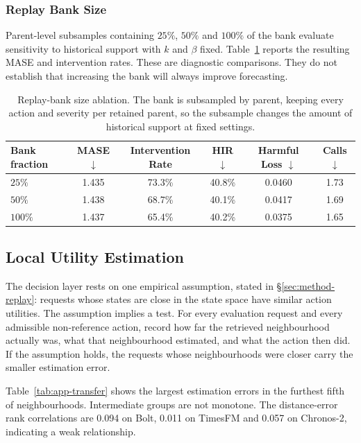 \documentclass{article}
\begin{document}
\subsubsection{Replay Bank Size}
\label{app:replaysize}
Parent-level subsamples containing $25\%$, $50\%$ and $100\%$ of the bank evaluate
sensitivity to historical support with $k$ and $\beta$ fixed. Table~\ref{tab:app-replaysize}
reports the resulting MASE and intervention rates. These are diagnostic comparisons.
They do not establish that increasing the bank will always improve forecasting.

\begin{table}[htbp]
  \caption{Replay-bank size ablation. The bank is subsampled by parent, keeping
  every action and severity per retained parent, so the subsample changes the amount of
  historical support at fixed settings.}
  \label{tab:app-replaysize}
  \centering
  \small
  \setlength{\tabcolsep}{4pt}
  \begin{tabular}{lccccc}
    \toprule
    Bank fraction & MASE $\downarrow$ & Intervention Rate & HIR $\downarrow$ & Harmful Loss $\downarrow$ & Calls $\downarrow$ \\
    \midrule
    $25\%$  & 1.435  & 73.3\%  & 40.8\%  & 0.0460  & 1.73 \\
    $50\%$  & 1.438  & 68.7\%  & 40.1\%  & 0.0417  & 1.69 \\
    $100\%$ & 1.437 & 65.4\% & 40.2\% & 0.0375 & 1.65 \\
    \bottomrule
  \end{tabular}
\end{table}

\subsection{Local Utility Estimation}
\label{app:transfer}
The decision layer rests on one empirical assumption, stated in \S\ref{sec:method-replay}:
requests whose states are close in the state space have similar action utilities. The
assumption implies a test. For every evaluation request and every admissible non-reference
action, record how far the retrieved neighbourhood actually was, what that neighbourhood
estimated, and what the action then did. If the assumption holds, the requests whose
neighbourhoods were closer carry the smaller estimation error.

Table~\ref{tab:app-transfer} shows the largest estimation errors in the furthest fifth
of neighbourhoods. Intermediate groups are not monotone. The distance-error rank correlations
are 0.094 on Bolt, 0.011 on TimesFM and 0.057 on Chronos-2, indicating a weak relationship.
\end{document}
